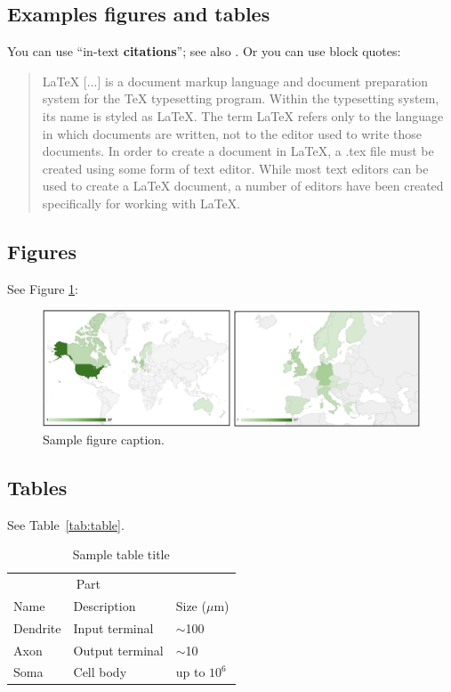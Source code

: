 \begin{paper}
\section*{Examples figures and tables}
\label{sec:Others}
\lipsum[8] 

You can use ``in-text \textbf{citations}''\citep[see][5]{wiki:xx2}; see also \cite{wiki:xx2}. Or you can use block quotes:

\begin{quote}
LaTeX [...] is a document markup language and document preparation system for the TeX typesetting program. Within the typesetting system, its name is styled as \LaTeX. The term LaTeX refers only to the language in which documents are written, not to the editor used to write those documents. In order to create a document in LaTeX, a .tex file must be created using some form of text editor. While most text editors can be used to create a LaTeX document, a number of editors have been created specifically for working with LaTeX.

\citep{wiki:xx2}
\end{quote}

\subsection*{Figures}
See Figure \ref{fig:demographic}: 


\begin{figure}[H]
  \centering
\includegraphics[width=\textwidth]{media/martinez1.png}  \caption{Sample figure caption.}
  \label{fig:demographic}
\end{figure}

\subsection*{Tables}
\lipsum[12]
See  Table~\ref{tab:table}.

\begin{table}[H]
 \caption{Sample table title}
  \centering
  \begin{tabular}{lll}
    \toprule
    \multicolumn{2}{c}{Part}                   \\
    \cmidrule(r){1-2}
    Name     & Description     & Size ($\mu$m) \\
    \midrule
    Dendrite & Input terminal  & $\sim$100     \\
    Axon     & Output terminal & $\sim$10      \\
    Soma     & Cell body       & up to $10^6$  \\
    \bottomrule
  \end{tabular}
  \label{tab:Table}
\end{table}


  


\end{paper}